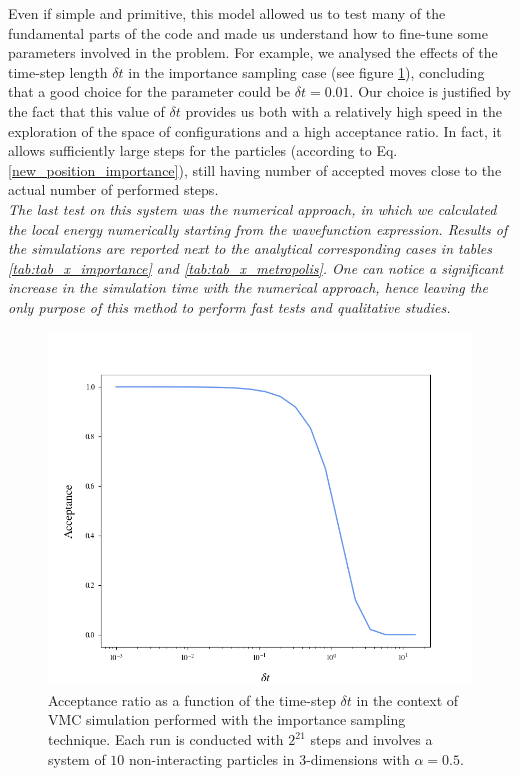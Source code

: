 Even if simple and primitive, this model allowed us to test many of the fundamental parts of the code and made us understand how to fine-tune some parameters involved in the problem. For example, we analysed the effects of the time-step length $\delta t$ in the importance sampling case (see figure \ref{fig:dt_importance_sampling}), concluding that a good choice for the parameter could be $\delta t = 0.01$. Our choice is justified by the fact that this value of $\delta t$ provides us both with a relatively high speed in the exploration of the space of configurations and a high acceptance ratio. In fact, it allows sufficiently large steps for the particles (according to Eq.\,\ref{new_position_importance}), still having number of accepted moves close to the actual number of performed steps. \\

\textit{
The last test on this system was the numerical approach, in which we calculated the local energy numerically starting from the wavefunction expression. Results of the simulations are reported next to the analytical corresponding cases in tables \ref{tab:tab_x_importance} and \ref{tab:tab_x_metropolis}. One can notice a significant increase in the simulation time with the numerical approach, hence leaving the only purpose of this method to perform fast tests and qualitative studies.}


\begin{figure}[H]
    \centering
    \includegraphics[scale=0.45]{images/time_steplength.png}
    \caption{Acceptance ratio as a function of the time-step $\delta t$ in the context of VMC simulation performed with the importance sampling technique. Each run is conducted with $2^{21}$ steps and involves a system of $10$ non-interacting particles in 3-dimensions with $\alpha=0.5$.  }
    \label{fig:dt_importance_sampling}
\end{figure}




